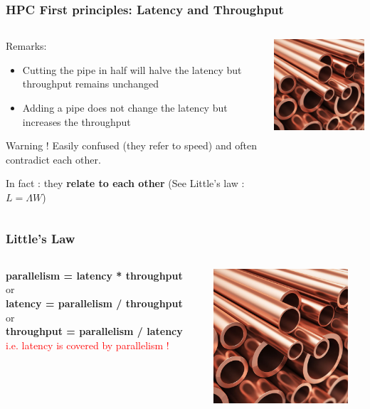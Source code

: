 \begin{frame}[containsverbatim]
\frametitle{HPC First principles: Latency and Throughput}
\begin{columns}[c]
	\begin{column}{5cm}
	Remarks:
	\begin{itemize}
	\item Cutting the pipe in half will halve the latency but throughput remains unchanged
	\item Adding a pipe does not change the latency but increases the throughput
	\end{itemize}
	\begin{alertblock}{Warning !}
	Easily confused (they refer to speed) and often contradict each other.
	\end{alertblock}
	In fact : they \textbf{relate to each other} (See Little's law : $L = \Lambda W$)
	\end{column} 
	\begin{column}{5cm}
	\includegraphics[width=5cm]{DayGilles/images/waterpipes.jpg}
	\end{column}
\end{columns} 
\end{frame}


\begin{frame}[containsverbatim]
\frametitle{Little's Law}
\begin{columns}[c]
	\begin{column}{5cm}
	\textbf{parallelism = latency * throughput}
	\\
	or
	\\
	\textbf{latency = parallelism / throughput}
	\\
	or
	\\
	\textbf{throughput = parallelism / latency}
	\\
	\textcolor{red}{i.e. latency is covered by parallelism !}
	\end{column} 
	\begin{column}{5cm}
	\includegraphics[width=5cm]{DayGilles/images/waterpipes.jpg}
	\end{column}
\end{columns} 
\end{frame}




